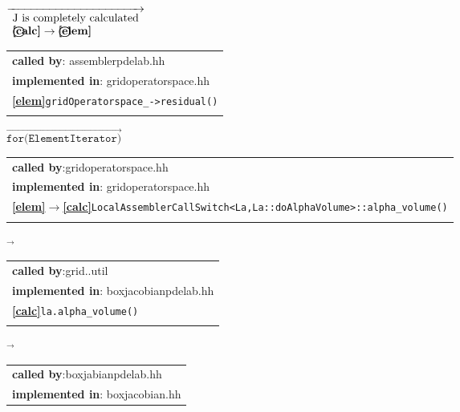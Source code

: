 \begin{landscape}
{    {\scriptsize$\overrightarrow{
    \begin{array}{l}
    \textnormal{J is completely calculated}\\
    \textnormal{\textbf{\textcircled{\ref{calc}}}}\rightarrow\textnormal{\textbf{\textcircled{\ref{elem}}}}
    \end{array}
    }$}
   \nextline
       \begin{tabular}{|l|}
      \hline
      \textbf{called by}: assemblerpdelab.hh\\
      \textbf{implemented in}: gridoperatorspace.hh\\  
      \textbf{\textcircled{\ref{elem}}}\verb+gridOperatorspace_->residual()+ \\
    \begin{scriptsize}\end{scriptsize}\\\hline 
  \end{tabular}
    {\scriptsize$\overrightarrow{
    \texttt{for(ElementIterator)}
    }$}
\nextline
      \begin{tabular}{|l|}
      \hline
      \textbf{called by}:gridoperatorspace.hh\\
      \textbf{implemented in}: gridoperatorspace.hh\\  
      \textnormal{\textbf{\textcircled{\ref{elem}}}}$\rightarrow$\textnormal{\textbf{\textcircled{\ref{calc}}}}\verb+LocalAssemblerCallSwitch<La,La::doAlphaVolume>::alpha_volume()+ \\
    \begin{scriptsize}\end{scriptsize}\\\hline 
  \end{tabular}
    $\overrightarrow{
    }$
   \begin{tabular}{|l|}
      \hline
      \textbf{called by}:grid..util\\
      \textbf{implemented in}: boxjacobianpdelab.hh\\  
      \textbf{\textcircled{\ref{calc}}}\verb+la.alpha_volume()+ \\
    \begin{scriptsize}\end{scriptsize}\\\hline 
  \end{tabular}
    $\overrightarrow{
    }$
\nextline
     \begin{tabular}{|l|}
      \hline
      \textbf{called by}:boxjabianpdelab.hh\\
      \textbf{implemented in}: boxjacobian.hh\\  

\end{tabular}}
\end{landscape}
